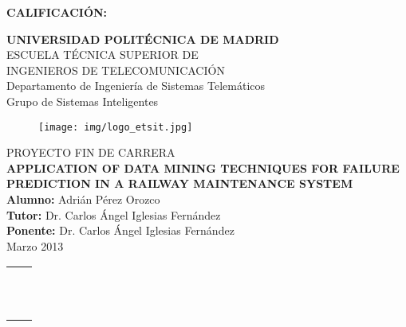 \documentclass[a4paper,11pt,svgnames]{book}
\begin{document}
{\large{\bf CALIFICACIÓN:}}
\pagestyle{empty}
\cleardoublepage
\vspace*{\baselineskip}
\begin{center}
	{\LARGE\rm\textbf{UNIVERSIDAD POLITÉCNICA DE MADRID}\\
	\vspace{1.0cm}
	 ESCUELA TÉCNICA SUPERIOR DE\\ INGENIEROS DE TELECOMUNICACIÓN
	  }  \\

	 {\Large\rm Departamento de Ingeniería de Sistemas Telemáticos\\
	 Grupo de Sistemas Inteligentes  }  \\

\begin{figure}[!htbp]
	\centering
    \texttt{[image: img/logo\_etsit.jpg]}

\end{figure}
	\vspace{1.0cm}
	{{\LARGE\rm PROYECTO FIN DE CARRERA\\
	\vspace{1.0cm}
	 \textbf{ APPLICATION OF DATA MINING TECHNIQUES FOR FAILURE PREDICTION IN A RAILWAY MAINTENANCE SYSTEM} }}  \\
	 \vspace{1.0cm}
     \Large\rm\textbf{Alumno:} Adrián Pérez Orozco\\
	 \textbf{Tutor:} Dr. Carlos Ángel Iglesias Fernández\\
     \textbf{Ponente:} Dr. Carlos Ángel Iglesias Fernández\\
	 \vspace{1.0cm}
	 Marzo 2013
\end{center}  

\cleardoublepage

\begin{tabular}{p{10cm}p{4cm}}
&\\
&\\
&\\
&\\
&\\
&\\
&\\
&\\
&\\
&\emph{ }\\
&\emph{ }\\
\end{tabular}

\cleardoublepage


\cleardoublepage

\cleardoublepage

\cleardoublepage

\cleardoublepage

\cleardoublepage

\pagestyle{fancy}
\fancyhf{}
\fancyhead[RO]{\slshape \rightmark}
\fancyhead[LE]{\slshape \leftmark}
\fancyfoot[C]{\thepage}








 

\end{document}

